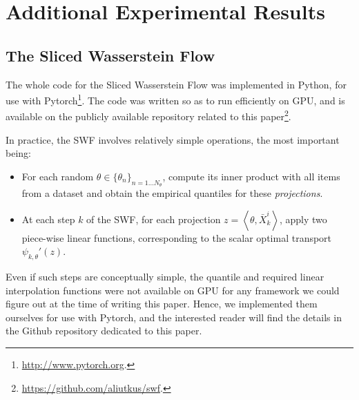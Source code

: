 





\section{Additional Experimental Results}

\subsection{The Sliced Wasserstein Flow}
The whole code for the Sliced Wasserstein Flow was implemented in Python, for use with Pytorch\footnote{\url{http://www.pytorch.org}.}. The code was written so as to run efficiently on GPU, and is available on the publicly available repository related to this paper\footnote{\url{https://github.com/aliutkus/swf}.}.

In practice, the SWF involves relatively simple operations, the most important being:
\begin{itemize}
  \item For each random $\theta\in\{\theta_n\}_{n=1\dots N_\theta}$,  compute its inner product with all items from a dataset and obtain the empirical quantiles for these \emph{projections}.
  \item At each step $k$ of the SWF, for each projection $z=\left<\theta, \bar{X}^i_k\right>$, apply two piece-wise linear functions, corresponding to the scalar optimal transport $\psi_{k, \theta}'(z)$.
\end{itemize}
Even if such steps are conceptually simple, the quantile and required linear interpolation functions were not available on GPU for any framework we could figure out at the time of writing this paper. Hence, we implemented them ourselves for use with Pytorch, and the interested reader will find the details in the Github repository dedicated to this paper.

